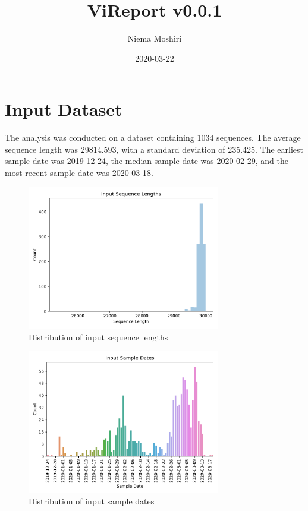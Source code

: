 \documentclass{article}
\title{\vspace{-2.0cm}ViReport v0.0.1}
\author{Niema Moshiri}
\date{2020-03-22}
\begin{document}
\maketitle

\section{Input Dataset}
The analysis was conducted on a dataset containing 1034 sequences. The average sequence length was 29814.593, with a standard deviation of 235.425. The earliest sample date was 2019-12-24, the median sample date was 2020-02-29, and the most recent sample date was 2020-03-18.

\begin{figure}[h]
\centering
\includegraphics[width=0.75\textwidth,keepaspectratio]{./figs/input_sequence_lengths.pdf}
\caption{Distribution of input sequence lengths}
\end{figure}



\begin{figure}[h]
\centering
\includegraphics[width=0.75\textwidth,keepaspectratio]{./figs/input_sample_dates.pdf}
\caption{Distribution of input sample dates}
\end{figure}
\end{document}
